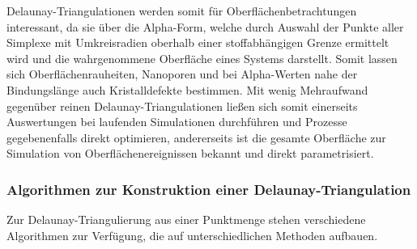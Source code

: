 Delaunay-Triangulationen werden somit für Oberflächenbetrachtungen interessant, da sie über die Alpha-Form, welche durch Auswahl der Punkte aller Simplexe mit Umkreisradien oberhalb einer stoffabhängigen Grenze ermittelt wird und die wahrgenommene Oberfläche eines Systems darstellt.
Somit lassen sich Oberflächenrauheiten, Nanoporen und bei Alpha-Werten nahe der Bindungslänge auch Kristalldefekte bestimmen.
Mit wenig Mehraufwand gegenüber reinen Delaunay-Triangulationen ließen sich somit einerseits Auswertungen bei laufenden Simulationen durchführen und Prozesse gegebenenfalls direkt optimieren, andererseits ist die gesamte Oberfläche zur Simulation von Oberflächenereignissen bekannt und direkt parametrisiert.

\subsubsection{Algorithmen zur Konstruktion einer Delaunay-Triangulation}

Zur Delaunay-Triangulierung aus einer Punktmenge stehen verschiedene Algorithmen zur Verfügung, die auf unterschiedlichen Methoden aufbauen.

